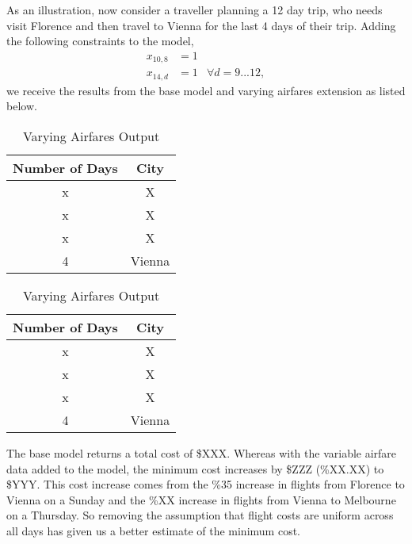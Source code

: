 \documentclass[12pt]{article}
\begin{document}
As an illustration, now consider a traveller planning a 12 day trip, who needs visit Florence and then travel to Vienna for the last 4 days of their trip. Adding the following constraints to the model,
\begin{align}
x_{10,8} &= 1 & \nonumber\\
x_{14,d} &= 1 & \forall d=9...12, \nonumber
\end{align}
we receive the results from the base model and varying airfares extension as listed below.

\begin{table}[ht]
	\begin{minipage}[b]{0.45\linewidth}
		\caption{Base Model Output}
		\centering
		\vspace{1mm}
		\begin{tabular}{| c || c |}
			\hline
			Number of Days & City \\ \hline \hline
			x & X \\ \hline
			x & X \\ \hline
			x & X \\ \hline
			4 & Vienna \\ \hline
		\end{tabular}
		\label{varying_airfares_example_1}
	\end{minipage}
	\hspace{0.5cm}
	\begin{minipage}[b]{0.45\linewidth}
		\caption{Varying Airfares Output}
		\centering
		\vspace{1mm}
		\begin{tabular}{| c || c |}
			\hline
			Number of Days & City \\ \hline \hline
			x & X \\ \hline
			x & X \\ \hline
			x & X \\ \hline
			4 & Vienna \\ \hline
		\end{tabular}
		\label{varying_airfares_example_2}
	\end{minipage}
\end{table}

The base model returns a total cost of \$XXX. Whereas with the variable airfare data added to the model, the minimum cost increases by \$ZZZ (\%XX.XX) to \$YYY. This cost increase comes from the \%35 increase in flights from Florence to Vienna on a Sunday and the \%XX increase in flights from Vienna to Melbourne on a Thursday.  So removing the assumption that flight costs are uniform across all days has given us a better estimate of the minimum cost.
\end{document}
